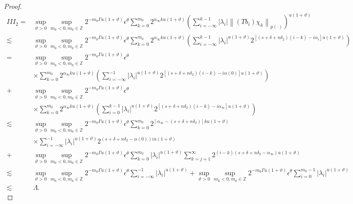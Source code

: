 \documentclass[10pt,a4paper]{amsart}
\begin{document}
\begin{proof}
\begin{align*}
I I I_{2}= & \sup_{\vartheta>0 }\sup _{m_0<0, m_0\in  \mathbb{Z}} 2^{-m_0\Gamma u(1+\vartheta)} \epsilon  ^\theta \sum_{k=0}^{m_0} 2^{\alpha_{\infty} k u(1+\vartheta)}\left(\sum_{i=-\infty}^{k-1}\left|\lambda_{i}\right|\left\|\left(T b_{i}\right) \chi_{k}\right\|_{{p(\cdot)}}\right)^{u(1+\vartheta)} \\
\lesssim & \sup_{\vartheta>0 }\sup _{m_0<0, m_0\in  \mathbb{Z}} 2^{-m_0\Gamma u(1+\vartheta)} \epsilon  ^\theta  \sum_{k=0}^{m_0} 2^{\alpha_{\infty} k u(1+\vartheta)}\left(\sum_{i=-\infty}^{k-1}\left|\lambda_{i}\right|^{u(1+\vartheta)} 2^{\left[\left(s+\delta+n \delta_{2}\right)(i-k)-i \alpha_{i}\right] u(1+\vartheta)}\right) \\
= & \sup_{\vartheta>0 }\sup _{m_0<0, m_0\in  \mathbb{Z}} 2^{-m_0\Gamma u(1+\vartheta)} \epsilon  ^\theta\\
& \times \sum_{k=0}^{m_0} 2^{\alpha_{\infty} k u(1+\vartheta)}\left(\sum_{i=-\infty}^{-1}\left|\lambda_{i}\right|^{u(1+\vartheta)} 2^{\left[\left(s+\delta+n \delta_{2}\right)(i-k)-i \alpha(0)\right] u(1+\vartheta)}\right) \\
+& \sup_{\vartheta>0 }\sup _{m_0<0, m_0\in  \mathbb{Z}} 2^{-m_0\Gamma u(1+\vartheta)} \epsilon  ^\theta \\
& \times \sum_{k=0}^{m_0} 2^{\alpha_{\infty} k u(1+\vartheta)}\left(\sum_{i=0}^{k-1}\left|\lambda_{i}\right|^{u(1+\vartheta)} 2^{\left[\left(s+\delta+n \delta_{2}\right)(i-k)-i \alpha_{\infty}\right] u(1+\vartheta)}\right)\\
\lesssim & \sup_{\vartheta>0 }\sup _{m_0<0, m_0\in  \mathbb{Z}} 2^{-m_0\Gamma u(1+\vartheta)} \epsilon  ^\theta \sum_{k=0}^{m_0} 2^{\left[\alpha_{\infty}-\left(s+\delta+n \delta_{2}\right)\right] k u(1+\vartheta)} \\
& \times \sum_{i=-\infty}^{-1}\left|\lambda_{i}\right|^{u(1+\vartheta)} 2^{\left(s+\delta+n \delta_{2}-\alpha(0)\right) iu (1+\vartheta)} \\
+& \sup_{\vartheta>0 }\sup _{m_0<0, m_0\in  \mathbb{Z}} 2^{-m_0\Gamma u(1+\vartheta)} \epsilon  ^\theta \sum_{k=0}^{m_0}\left|\lambda_{i}\right|^{u(1+\vartheta)} \sum_{k=j+1}^{\infty} 2^{(i-k)\left(s+\delta+n \delta_{2}-\alpha_{\infty}\right) u(1+\vartheta)} \\
\lesssim & \sup_{\vartheta>0 }\sup _{m_0<0, m_0\in  \mathbb{Z}} 2^{-m_0\Gamma u(1+\vartheta)} \epsilon  ^\theta \sum_{i=-\infty}^{-1}\left|\lambda_{i}\right|^{u(1+\vartheta)}+\sup_{\vartheta>0 }\sup _{m_0<0, m_0\in  \mathbb{Z}} 2^{-m_0\Gamma u(1+\vartheta)} \epsilon  ^\theta \sum_{i=0}^{m_0-1}\left|\lambda_{i}\right|^{u(1+\vartheta)} \\
\lesssim & \Lambda .
\end{align*}






\end{proof}
\end{document}
